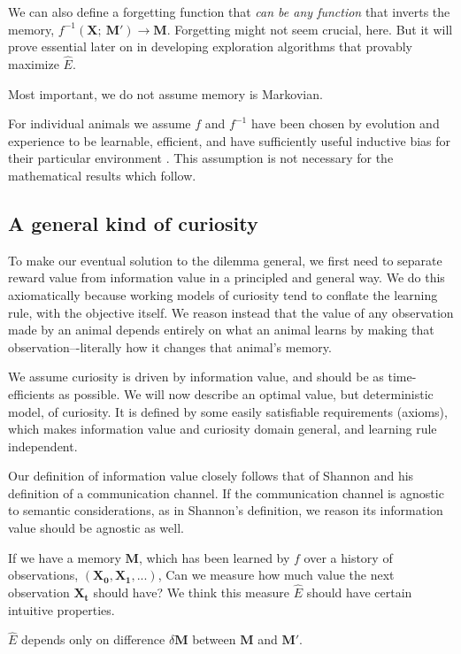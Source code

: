 We can also define a forgetting function that \textit{can be any function} that inverts the memory, $f^{-1}(\mathbf{X};\ \mathbf{M}') \rightarrow \mathbf{M}$. Forgetting might not seem crucial, here. But it will prove essential later on in developing exploration algorithms that provably maximize $\hat E$. 

Most important, we do not assume memory is Markovian.

For individual animals we assume $f$ and $f^{-1}$ have been chosen by evolution and experience to be learnable, efficient, and have sufficiently useful inductive bias for their particular environment \cite{Valiant1984,Thrun1992a}. This assumption is not necessary for the mathematical results which follow.

\subsection{A general kind of curiosity} 
To make our eventual solution to the dilemma general, we first need to separate reward value from information value in a principled and general way. We do this axiomatically because working models of curiosity tend to conflate the learning rule, with the objective itself. We reason instead that the value of any observation made by an animal depends entirely on what an animal learns by making that observation–-literally how it changes that animal's memory. 

We assume curiosity is driven by information value, and should be as time-efficients as possible. We will now describe an optimal value, but deterministic model, of curiosity. It is defined by some easily satisfiable requirements (axioms), which makes information value and curiosity domain general, and learning rule independent. 

Our definition of information value closely follows that of Shannon and his definition of a communication channel. If the communication channel is agnostic to semantic considerations, as in Shannon's definition, we reason its information value should be agnostic as well.

If we have a memory $\mathbf{M}$, which has been learned by $f$ over a history of observations, $(\mathbf{X_0},\mathbf{X_1},...)$, Can we measure how much value the next observation $\mathbf{X_t}$ should have? We think this measure $\hat E$ should have certain intuitive properties.

\begin{axiom}
	$\hat E$ depends only on difference $\delta \mathbf{M}$ between $\mathbf{M}$ and $\mathbf{M'}$.
\end{axiom}

